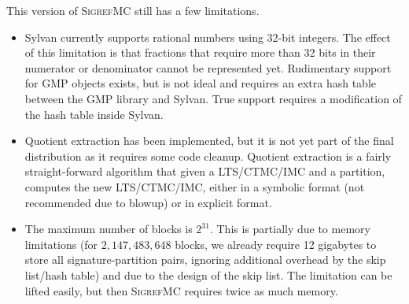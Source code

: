
This version of \textsc{SigrefMC} still has a few limitations.

\begin{itemize}

\item
Sylvan currently supports rational numbers using 32-bit integers.
The effect of this limitation is that fractions that require more than 32 bits in their numerator or denominator cannot be represented yet.
Rudimentary support for GMP objects exists, but is not ideal and requires an extra hash table between the GMP library and Sylvan.
True support requires a modification of the hash table inside Sylvan.

\item
Quotient extraction has been implemented, but it is not yet part of the final distribution as it requires some code cleanup. Quotient extraction is a fairly straight-forward algorithm that given a LTS/CTMC/IMC and a partition, computes the new LTS/CTMC/IMC, either in a symbolic format (not recommended due to blowup) or in explicit format.

\item
The maximum number of blocks is $2^{31}$. This is partially due to memory limitations (for $2,147,483,648$ blocks, we already require 12 gigabytes to store all signature-partition pairs, ignoring additional overhead by the skip list/hash table) and due to the design of the skip list. The limitation can be lifted easily, but then \textsc{SigrefMC} requires twice as much memory.

\end{itemize}